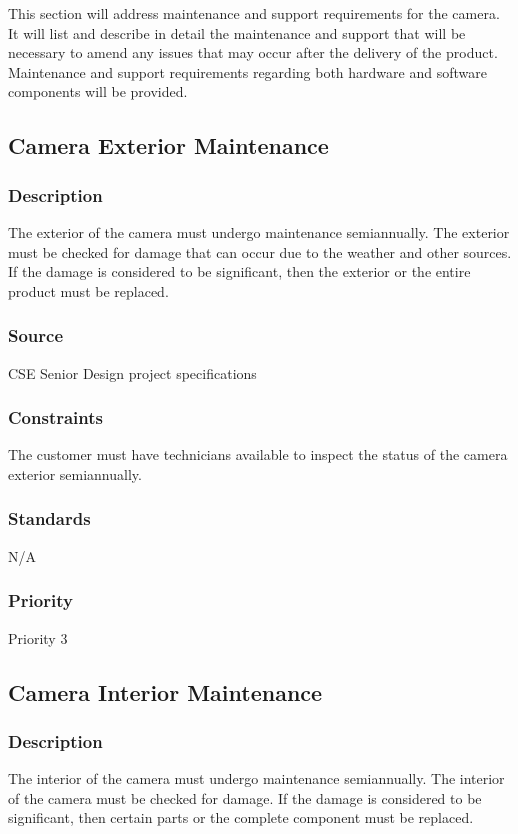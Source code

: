 This section will address maintenance and support requirements for the camera. It will list and describe in detail the maintenance and support that will be necessary to amend any issues that may occur after the delivery of the product. Maintenance and support requirements regarding both hardware and software components will be provided. 

\subsection{Camera Exterior Maintenance}
\subsubsection{Description}
The exterior of the camera must undergo maintenance semiannually. The exterior must be checked for damage that can occur due to the weather and other sources. If the damage is considered to be significant, then the exterior or the entire product must be replaced. 
\subsubsection{Source}
CSE Senior Design project specifications
\subsubsection{Constraints}
The customer must have technicians available to inspect the status of the camera exterior semiannually. 
\subsubsection{Standards}
N/A
\subsubsection{Priority}
Priority 3

\subsection{Camera Interior Maintenance}
\subsubsection{Description}
The interior of the camera must undergo maintenance semiannually. The interior of the camera must be checked for damage. If the damage is considered to be significant, then certain parts or the complete component must be replaced. 
